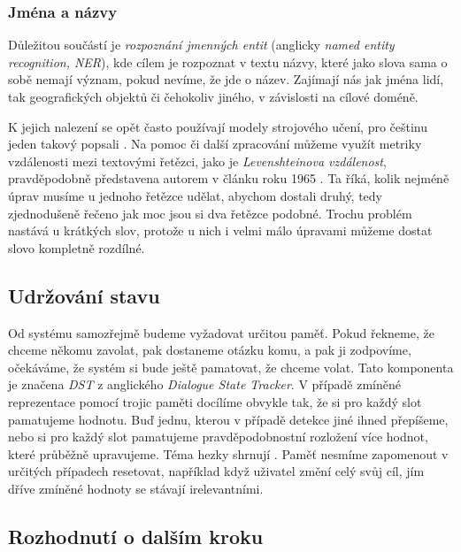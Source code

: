 \subsubsection{Jména a názvy}
Důležitou součástí je \textit{rozpoznání jmenných entit} (anglicky
\textit{named entity recognition, NER}),
kde cílem je rozpoznat v textu názvy, které jako slova sama o sobě nemají
význam, pokud nevíme, že jde o název. Zajímají nás jak jména lidí, tak
geografických objektů či čehokoliv jiného, v závislosti na cílové doméně.

K jejich nalezení se opět často používají modely strojového učení, pro češtinu
jeden takový popsali \citet{ekstein_czech_2019}. Na pomoc či další zpracování
můžeme využít metriky vzdálenosti mezi textovými řetězci,
jako je \textit{Levenshteinova vzdálenost}, pravděpodobně představena autorem v
článku roku 1965 \citep{Levenshtein1965BinaryCC}. Ta říká, kolik nejméně úprav
musíme u jednoho řetězce udělat, abychom dostali druhý, tedy zjednodušeně řečeno
jak moc jsou si dva řetězce podobné. Trochu problém nastává u krátkých slov,
protože u nich i velmi málo úpravami můžeme dostat slovo kompletně rozdílné.

\subsection{Udržování stavu}\label{dst}

Od systému samozřejmě budeme vyžadovat určitou paměť. Pokud řekneme, že
chceme někomu zavolat, pak dostaneme otázku komu, a pak ji zodpovíme, očekáváme,
že systém si bude ještě pamatovat, že chceme volat. Tato komponenta je
značena \textit{DST} z anglického \textit{Dialogue State Tracker}. V případě
zmíněné reprezentace pomocí trojic paměti docílíme obvykle tak, že si pro každý
slot pamatujeme hodnotu. Buď jednu, kterou v případě detekce jiné ihned přepíšeme,
nebo si pro každý slot pamatujeme pravděpodobnostní rozložení více hodnot, které
průběžně upravujeme. Téma hezky shrnují \citet{williams_dialog_2016}.
Paměť nesmíme zapomenout v určitých případech
resetovat, například když uživatel změní celý svůj cíl, jím dříve
zmíněné hodnoty se stávají irelevantními.

\subsection{Rozhodnutí o dalším kroku}\label{dp}

